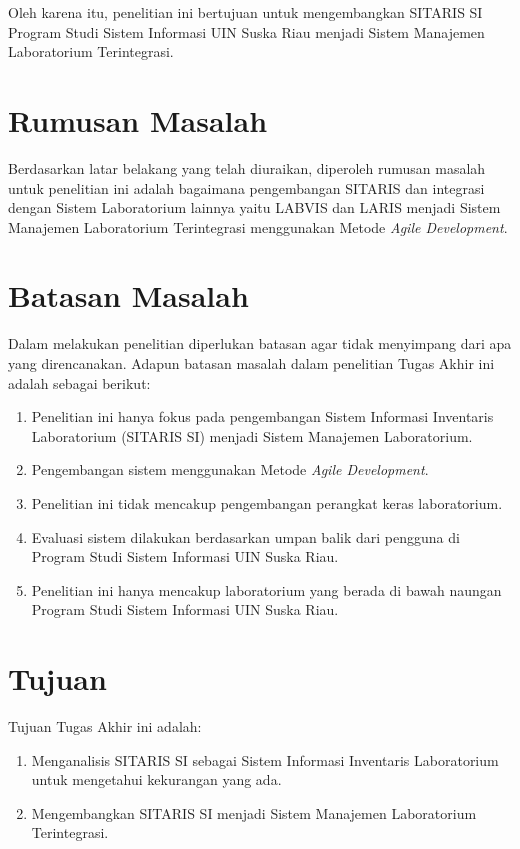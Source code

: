 Oleh karena itu, penelitian ini bertujuan untuk mengembangkan SITARIS SI Program Studi Sistem Informasi UIN Suska Riau menjadi Sistem Manajemen Laboratorium Terintegrasi.
\section{Rumusan Masalah}
Berdasarkan latar belakang yang telah diuraikan, diperoleh rumusan masalah untuk penelitian ini adalah bagaimana pengembangan SITARIS dan integrasi dengan Sistem Laboratorium lainnya yaitu LABVIS dan LARIS menjadi Sistem Manajemen Laboratorium Terintegrasi menggunakan Metode \textit{Agile Development}.

\section{Batasan Masalah}
Dalam melakukan penelitian diperlukan batasan agar tidak menyimpang dari apa yang direncanakan. Adapun batasan masalah dalam penelitian Tugas Akhir ini adalah sebagai berikut:
\begin{enumerate}
	\item Penelitian ini hanya fokus pada pengembangan Sistem Informasi Inventaris Laboratorium (SITARIS SI) menjadi Sistem Manajemen Laboratorium.
	\item Pengembangan sistem menggunakan Metode \textit{Agile Development}.
	\item Penelitian ini tidak mencakup pengembangan perangkat keras laboratorium.
	\item Evaluasi sistem dilakukan berdasarkan umpan balik dari pengguna di Program Studi Sistem Informasi UIN Suska Riau.
	\item Penelitian ini hanya mencakup laboratorium yang berada di bawah naungan Program Studi Sistem Informasi UIN Suska Riau.
\end{enumerate}

\section{Tujuan}
Tujuan Tugas Akhir ini adalah:
\begin{enumerate}
	\item Menganalisis SITARIS SI sebagai Sistem Informasi Inventaris Laboratorium untuk mengetahui kekurangan yang ada.
	\item Mengembangkan SITARIS SI menjadi Sistem Manajemen Laboratorium Terintegrasi.
\end{enumerate}

